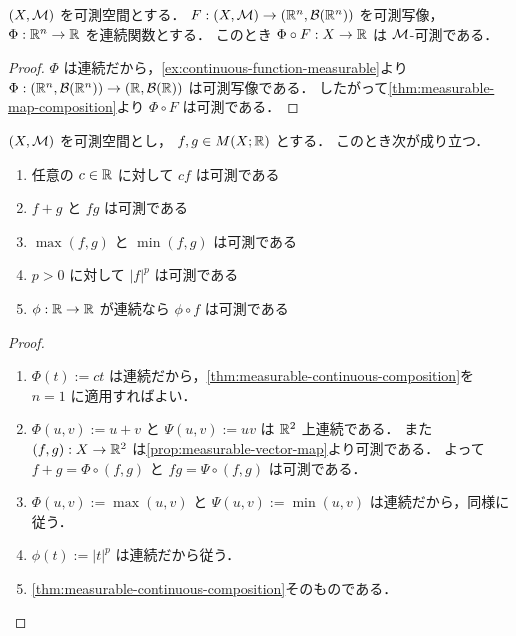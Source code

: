 \begin{corollary}[連続写像との合成]\label{thm:measurable-continuous-composition}
$(X,\mathcal M)$ を可測空間とする．
$F:(X,\mathcal M)\to(\mathbb R^n,\mathcal B(\mathbb R^n))$ を可測写像，
$\Phi:\mathbb R^n\to\mathbb R$ を連続関数とする．
このとき $\Phi\circ F:X\to\mathbb R$ は $\mathcal M$-可測である．
\end{corollary}
\begin{proof}
$\Phi$ は連続だから，\cref{ex:continuous-function-measurable}より
$\Phi:(\mathbb R^n,\mathcal B(\mathbb R^n))\to(\mathbb R,\mathcal B(\mathbb R))$ は可測写像である．
したがって\cref{thm:measurable-map-composition}より $\Phi\circ F$ は可測である．
\end{proof}

\begin{corollary}[代数演算と合成]\label{cor:measurable-algebra-operations}
$(X,\mathcal M)$ を可測空間とし，
$f,g\in M(X;\mathbb R)$ とする．
このとき次が成り立つ．
\begin{enumerate}
    \item 任意の $c\in\mathbb R$ に対して $cf$ は可測である
    \item $f+g$ と $fg$ は可測である
    \item $\max(f,g)$ と $\min(f,g)$ は可測である
    \item $p>0$ に対して $|f|^p$ は可測である
    \item $\phi:\mathbb R\to\mathbb R$ が連続なら $\phi\circ f$ は可測である
\end{enumerate}
\end{corollary}
\begin{proof}
\begin{enumerate}
    \item $\Phi(t):=ct$ は連続だから，\cref{thm:measurable-continuous-composition}を $n=1$ に適用すればよい．

    \item $\Phi(u,v):=u+v$ と $\Psi(u,v):=uv$ は $\mathbb R^2$ 上連続である．
    また $(f,g):X\to\mathbb R^2$ は\cref{prop:measurable-vector-map}より可測である．
    よって $f+g=\Phi\circ(f,g)$ と $fg=\Psi\circ(f,g)$ は可測である．

    \item $\Phi(u,v):=\max(u,v)$ と $\Psi(u,v):=\min(u,v)$ は連続だから，同様に従う．

    \item $\phi(t):=|t|^p$ は連続だから従う．

    \item \cref{thm:measurable-continuous-composition}そのものである．
\end{enumerate}
\end{proof}

